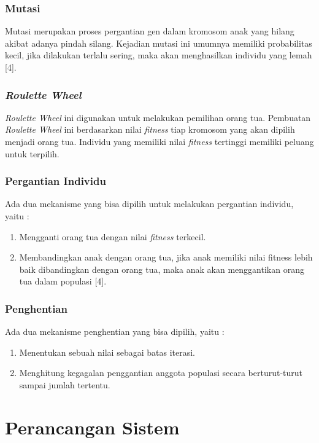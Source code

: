 \documentclass[12pt,a4paper]{report}
\begin{document}
		\subsection{Mutasi}
		Mutasi merupakan proses pergantian gen dalam kromosom anak yang hilang akibat adanya pindah silang. Kejadian mutasi ini umumnya memiliki probabilitas kecil, jika dilakukan terlalu sering, maka akan menghasilkan individu yang lemah [4].
		\subsection{\emph{Roulette Wheel}}
		\emph{Roulette Wheel} ini digunakan untuk melakukan pemilihan orang tua. Pembuatan \emph{Roulette Wheel} ini berdasarkan nilai \emph{fitness} tiap kromosom yang akan dipilih menjadi orang tua. Individu yang memiliki nilai \emph{fitness} tertinggi memiliki peluang untuk terpilih.
		\subsection{Pergantian Individu}
		Ada dua mekanisme yang bisa dipilih untuk melakukan pergantian individu, yaitu : 
		\begin{enumerate}
			\item Mengganti orang tua dengan nilai \emph{fitness} terkecil.
			
			\item Membandingkan anak dengan orang tua, jika anak memiliki nilai fitness lebih baik dibandingkan dengan orang tua, maka anak akan menggantikan orang tua dalam populasi [4].
		\end{enumerate}
		
		
		\subsection{Penghentian}
		Ada dua mekanisme penghentian yang bisa dipilih, yaitu :	
		\begin{enumerate}
			\item Menentukan sebuah nilai sebagai batas iterasi.
			
			\item Menghitung kegagalan penggantian anggota populasi secara berturut-turut sampai jumlah tertentu.
		\end{enumerate}
		\newpage
		
		\chapter{Perancangan Sistem}
\end{document}
